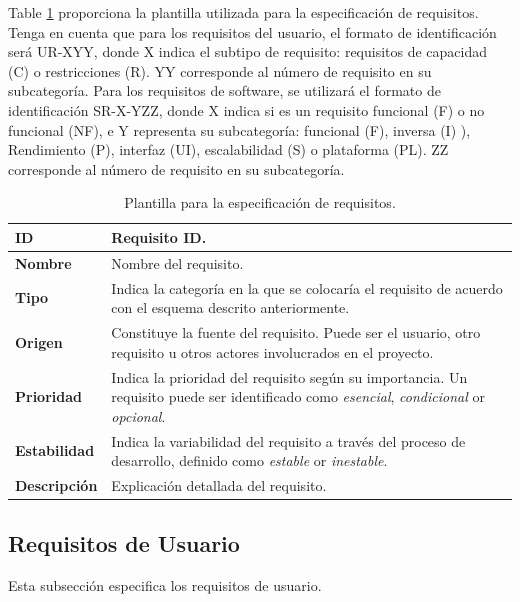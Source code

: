 Table \ref{tab:requirements_template} proporciona la plantilla utilizada para la especificación de requisitos. Tenga en cuenta que para los requisitos del usuario, el formato de identificación será UR-XYY, donde X indica el subtipo de requisito: requisitos de capacidad (C) o restricciones (R). YY corresponde al número de requisito en su subcategoría. Para los requisitos de software, se utilizará el formato de identificación SR-X-YZZ, donde X indica si es un requisito funcional (F) o no funcional (NF), e Y representa su subcategoría: funcional (F), inversa (I) ), Rendimiento (P), interfaz (UI), escalabilidad (S) o plataforma (PL). ZZ corresponde al número de requisito en su subcategoría.

\begin{center}
\begin{table}[htbp]
\centering
\begin{tabular}{@{}p{2.5cm} p{9cm}@{}} 
\toprule
\textbf{ID} 				& Requisito ID. \\
\midrule
\textbf{Nombre} 			& Nombre del requisito. \\
\midrule
\textbf{Tipo} 			& Indica la categoría en la que se colocaría el requisito de acuerdo con el esquema descrito anteriormente. \\
\midrule
\textbf{Origen} 			& Constituye la fuente del requisito. Puede ser el usuario, otro requisito u otros actores involucrados en el proyecto. \\
\midrule
\textbf{Prioridad}		& Indica la prioridad del requisito según su importancia. Un requisito puede ser identificado como \textit{esencial}, \textit{condicional} or \textit{opcional}. \\
\midrule
\textbf{Estabilidad} 		& Indica la variabilidad del requisito a través del proceso de desarrollo, definido como \textit{estable} or \textit{inestable}. \\
\midrule
\textbf{Descripción} 	& Explicación detallada del requisito. \\
\bottomrule
\end{tabular}
\caption{Plantilla para la especificación de requisitos.}
\label{tab:requirements_template}
\end{table}
\end{center}

\subsection{Requisitos de Usuario}

Esta subsección especifica los requisitos de usuario.

